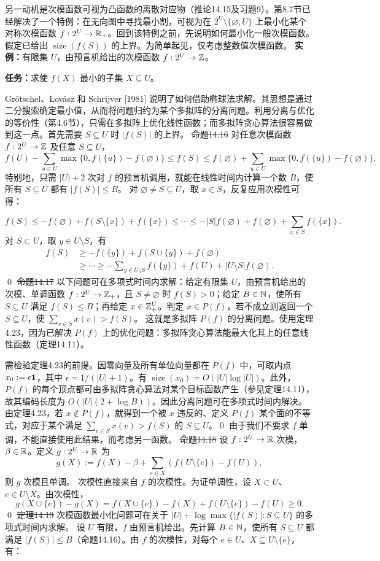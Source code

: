 另一动机是次模函数可视为凸函数的离散对应物（推论14.15及习题9）。第8.7节已经解决了一个特例：在无向图中寻找最小割，可视为在 $2^U\setminus\{\varnothing,U\}$ 上最小化某个对称次模函数 $f:2^U\to\mathbb R_+$。回到该特例之前，先说明如何最小化一般次模函数。假定已给出 $\operatorname{size}(f(S))$ 的上界。为简单起见，仅考虑整数值次模函数。
\textbf{实例：}有限集 $U$，由预言机给出的次模函数 $f:2^U\to\mathbb Z$。\par
\textbf{任务：}求使 $f(X)$ 最小的子集 $X\subseteq U$。

Grötschel、Lovász 和 Schrijver [1981] 说明了如何借助椭球法求解。其思想是通过二分搜索确定最小值，从而将问题归约为某个多拟阵的分离问题。利用分离与优化的等价性（第4.6节），只需在多拟阵上优化线性函数；而多拟阵贪心算法很容易做到这一点。首先需要 $S\subseteq U$ 时 $|f(S)|$ 的上界。
\st{命题14.16} 对任意次模函数 $f:2^U\to\mathbb Z$ 及任意 $S\subseteq U$，
\[f(U)-\sum_{u\in U}\max\{0,f(\{u\})-f(\varnothing)\}
\le f(S)\le f(\varnothing)+\sum_{u\in U}\max\{0,f(\{u\})-f(\varnothing)\}.\]
特别地，只需 $|U|+2$ 次对 $f$ 的预言机调用，就能在线性时间内计算一个数 $B$，使所有 $S\subseteq U$ 都有 $|f(S)|\le B$。
\pr 对 $\varnothing\ne S\subseteq U$，取 $x\in S$，反复应用次模性可得：

\[f(S)\le-f(\varnothing)+f(S\setminus\{x\})+f(\{x\})
\le\cdots\le-|S|f(\varnothing)+f(\varnothing)+\sum_{x\in S}f(\{x\}).\]
对 $S\subset U$，取 $y\in U\setminus S$，有
\begin{align*}
f(S)&\ge-f(\{y\})+f(S\cup\{y\})+f(\varnothing)\\
&\ge\cdots\ge-\sum_{y\in U\setminus S}f(\{y\})+f(U)+|U\setminus S|f(\varnothing).
\end{align*}\qed
\st{命题14.17} 以下问题可在多项式时间内求解：给定有限集 $U$，由预言机给出的次模、单调函数 $f:2^U\to\mathbb Z_+$，且 $S\ne\varnothing$ 时 $f(S)>0$；给定 $B\in\mathbb N$，使所有 $S\subseteq U$ 满足 $f(S)\le B$；再给定 $x\in\mathbb Z_+^U$。判定 $x\in P(f)$，若不成立则返回一个 $S\subseteq U$，使 $\sum_{v\in S}x(v)>f(S)$。
\pr 这就是多拟阵 $P(f)$ 的分离问题。使用定理4.23，因为已解决 $P(f)$ 上的优化问题：多拟阵贪心算法能最大化其上的任意线性函数（定理14.11）。

需检验定理4.23的前提。因零向量及所有单位向量都在 $P(f)$ 中，可取内点 $x_0:=\epsilon\mathbf 1$，其中 $\epsilon=1/(|U|+1)$。有 $\operatorname{size}(x_0)=O(|U|\log|U|)$。此外，$P(f)$ 的每个顶点都可由多拟阵贪心算法对某个目标函数产生（参见定理14.11），故其编码长度为 $O(|U|(2+\log B))$。因此分离问题可在多项式时间内解决。由定理4.23，若 $x\notin P(f)$，就得到一个被 $x$ 违反的、定义 $P(f)$ 某个面的不等式，对应于某个满足 $\sum_{v\in S}x(v)>f(S)$ 的 $S\subseteq U$。\qed
由于我们不要求 $f$ 单调，不能直接使用此结果，而考虑另一函数。
\st{命题14.18} 设 $f:2^U\to\mathbb R$ 次模，$\beta\in\mathbb R$。定义 $g:2^U\to\mathbb R$ 为
\[g(X):=f(X)-\beta+\sum_{e\in X}(f(U\setminus\{e\})-f(U)),\]
则 $g$ 次模且单调。
\pr 次模性直接来自 $f$ 的次模性。为证单调性，设 $X\subset U$、$e\in U\setminus X$。由次模性，
\[g(X\cup\{e\})-g(X)=f(X\cup\{e\})-f(X)+f(U\setminus\{e\})-f(U)\ge0.\]\qed
\st{定理14.19} 次模函数最小化问题可在关于 $|U|+\log\max\{|f(S)|:S\subseteq U\}$ 的多项式时间内求解。
\pr 设 $U$ 有限，$f$ 由预言机给出。先计算 $B\in\mathbb N$，使所有 $S\subseteq U$ 都满足 $|f(S)|\le B$（命题14.16）。由 $f$ 的次模性，对每个 $e\in U$、$X\subseteq U\setminus\{e\}$，有：

